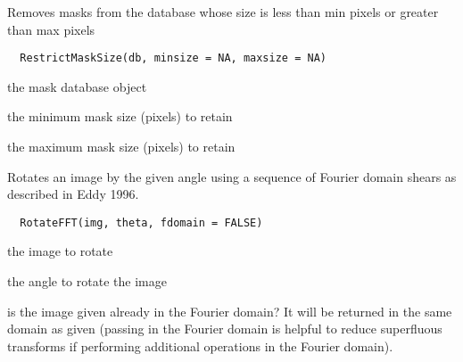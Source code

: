 \documentclass[a4paper]{book}
\begin{document}
%
\begin{Description}\relax
Removes masks from the database whose size is less than
min pixels or greater than max pixels
\end{Description}
%
\begin{Usage}
\begin{verbatim}
  RestrictMaskSize(db, minsize = NA, maxsize = NA)
\end{verbatim}
\end{Usage}
%
\begin{Arguments}
\begin{ldescription}
\item[\code{db}] the mask database object

\item[\code{min}] the minimum mask size (pixels) to retain

\item[\code{max}] the maximum mask size (pixels) to retain
\end{ldescription}
\end{Arguments}
%
\begin{Description}\relax
Rotates an image by the given angle using a sequence of
Fourier domain shears as described in Eddy 1996.
\end{Description}
%
\begin{Usage}
\begin{verbatim}
  RotateFFT(img, theta, fdomain = FALSE)
\end{verbatim}
\end{Usage}
%
\begin{Arguments}
\begin{ldescription}
\item[\code{img}] the image to rotate

\item[\code{theta}] the angle to rotate the image

\item[\code{fdomain}] is the image given already in the Fourier
domain?  It will be returned in the same domain as given
(passing in the Fourier domain is helpful to reduce
superfluous transforms if performing additional
operations in the Fourier domain).
\end{ldescription}
\end{Arguments}
\end{document}
